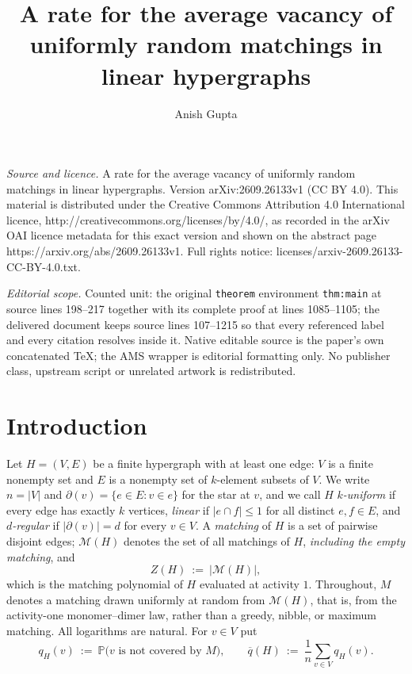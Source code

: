\documentclass[10pt,a4paper]{amsart}
\newcommand{\VV}{V}
\newcommand{\EE}{E}
\newcommand{\Mat}{\mathcal{M}}
\newcommand{\PP}{\mathbb{P}}
\newcommand{\qbar}{\overline{q}}
\newcommand{\dg}{\partial}
\begin{document}
\title[A rate for the average vacancy of uniformly random matchings]{A rate for the average vacancy of uniformly random matchings in linear hypergraphs}
\author{Anish Gupta}
\date{}
\maketitle
\noindent\emph{Source and licence.} A rate for the average vacancy of uniformly random matchings in linear hypergraphs. Version arXiv:2609.26133v1 (CC BY 4.0). This material is distributed under the Creative Commons Attribution 4.0 International licence, http://creativecommons.org/licenses/by/4.0/, as recorded in the arXiv OAI licence metadata for this exact version and shown on the abstract page https://arxiv.org/abs/2609.26133v1. Full rights notice: licenses/arxiv-2609.26133-CC-BY-4.0.txt.\par\smallskip
\noindent\textit{Editorial scope.} Counted unit: the original \texttt{theorem} environment \texttt{thm:main} at source lines 198--217 together with its complete proof at lines 1085--1105; the delivered document keeps source lines 107--1215 so that every referenced label and every citation resolves inside it. Native editable source is the paper's own concatenated TeX; the AMS wrapper is editorial formatting only. No publisher class, upstream script or unrelated artwork is redistributed.
\section{Introduction}
\label{sec:intro}

Let $H=(\VV,\EE)$ be a finite hypergraph with at least one edge: $\VV$ is a finite
nonempty set and $\EE$ is a nonempty set of $k$-element subsets of $\VV$. We write $n=|\VV|$
and $\dg(v)=\{e\in\EE:v\in e\}$ for the star at $v$, and we call $H$ \emph{$k$-uniform} if
every edge has exactly $k$ vertices, \emph{linear} if $|e\cap f|\le1$ for all distinct
$e,f\in\EE$, and \emph{$d$-regular} if $|\dg(v)|=d$ for every $v\in\VV$. A \emph{matching}
of $H$ is a set of pairwise disjoint edges; $\Mat(H)$ denotes the set of all matchings of
$H$, \emph{including the empty matching}, and
\[
  Z(H)\ :=\ |\Mat(H)| ,
\]
which is the matching polynomial of $H$ evaluated at activity $1$. Throughout, $M$ denotes
a matching drawn uniformly at random from $\Mat(H)$, that is, from the activity-one
monomer--dimer law, rather than a greedy, nibble, or maximum matching. All logarithms are
natural. For $v\in\VV$ put
\[
  q_H(v)\ :=\ \PP\bigl(v\text{ is not covered by }M\bigr),
  \qquad
  \qbar(H)\ :=\ \frac1n\sum_{v\in\VV}q_H(v).
\]
\end{document}
